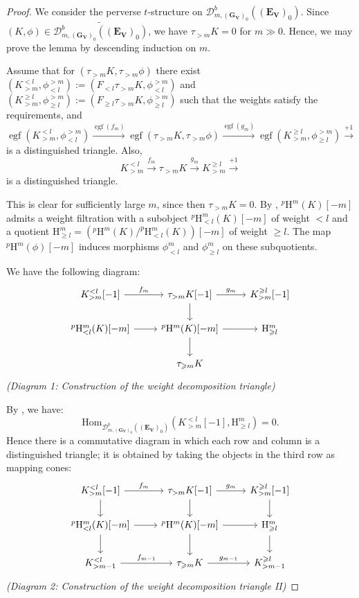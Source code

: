\documentclass[10pt,a4paper]{amsart}
\begin{document}
\begin{proof}
We consider the perverse $t$-structure on $\mathcal{D}^b_{m,(\mathbf{G}_{\mathbf{V}})_0}((\mathbf{E}_{\mathbf{V}})_0)$. Since $(K,\phi) \in \widetilde{\mathcal{D}^{b}_{m,(\mathbf{G}_{\mathbf{V}})_0}((\mathbf{E}_{\mathbf{V}})_0)}$, we have $\tau_{>m}K = 0$ for $m \gg 0$. Hence, we may prove the lemma by descending induction on $m$.

Assume that for $(\tau_{>m}K,\tau_{>m}\phi)$ there exist $(K_{>m}^{<l},\phi^{>m}_{<l}) := (F_{<l} \tau_{>m}K, \phi^{>m}_{<l})$ and $(K_{>m}^{\geq l},\phi^{>m}_{\geq l}) := (F_{\geq l} \tau_{>m}K, \phi^{>m}_{\geq l})$ such that the weights satisfy the requirements, and
\[
\operatorname{egf}(K_{>m}^{<l},\phi^{>m}_{<l}) \xrightarrow{\operatorname{egf}(f_m)} \operatorname{egf}(\tau_{>m}K,\tau_{>m}\phi) \xrightarrow{\operatorname{egf}(g_m)} \operatorname{egf}(K_{>m}^{\geq l},\phi^{>m}_{\geq l}) \xrightarrow{+1}
\]
is a distinguished triangle. Also,
\[
K_{>m}^{<l} \xrightarrow{f_m} \tau_{>m}K \xrightarrow{g_m} K_{>m}^{\geq l} \xrightarrow{+1}
\]
is a distinguished triangle.

This is clear for sufficiently large $m$, since then $\tau_{>m}K = 0$. By \cite[Theorem 5.4.16]{Pramod-2021}, $^{p}\mathrm{H}^m(K)[-m]$ admits a weight filtration with a subobject $^{p}\mathrm{H}^m_{<l}(K)[-m]$ of weight $< l$ and a quotient $\mathrm{H}^m_{\geq l} = (^{p}\mathrm{H}^m(K)/^{p}\mathrm{H}^m_{<l}(K))[-m]$ of weight $\geq l$. The map $^{p}\mathrm{H}^m(\phi)[-m]$ induces morphisms $\phi^m_{<l}$ and $\phi^m_{\geq l}$ on these subquotients.

We have the following diagram:
\[
\begin{tikzcd}
K_{>m}^{<l}[-1] \arrow[r, "f_m"] & \tau_{>m}K[-1] \arrow[r, "g_m"] \arrow[d] & K_{>m}^{\geq l}[-1] \\
^{p}\mathrm{H}^m_{<l}(K)[-m] \arrow[r] & ^{p}\mathrm{H}^m(K)[-m] \arrow[d] \arrow[r] & \mathrm{H}^m_{\geq l} \\
& \tau_{\geq m}K &
\end{tikzcd}
\]
\emph{(Diagram 1: Construction of the weight decomposition triangle)}

By \cite[Lemma 5.4.14(3)]{Pramod-2021}, we have:
\[
\mathrm{Hom}_{\mathcal{D}^b_{m,(\mathbf{G}_{\mathbf{V}})_0}((\mathbf{E}_{\mathbf{V}})_0)}(K_{>m}^{<l}[-1],\mathrm{H}^m_{\geq l})=0.
\]
Hence there is a commutative diagram in which each row and column is a distinguished triangle; it is obtained by taking the objects in the third row as mapping cones:
\[
\begin{tikzcd}
K_{>m}^{<l}[-1] \arrow[r, "f_m"] \arrow[d] & \tau_{>m}K[-1] \arrow[r, "g_m"] \arrow[d] & K_{>m}^{\geq l}[-1] \arrow[d] \\
^{p}\mathrm{H}^m_{<l}(K)[-m] \arrow[r] \arrow[d] & ^{p}\mathrm{H}^m(K)[-m] \arrow[d] \arrow[r] & \mathrm{H}^m_{\geq l} \arrow[d] \\
K_{>m-1}^{<l} \arrow[r, "f_{m-1}"] & \tau_{\geq m}K \arrow[r, "g_{m-1}"] & K_{>m-1}^{\geq l}
\end{tikzcd}
\]
\emph{(Diagram 2: Construction of the weight decomposition triangle II)}


\end{proof}
\end{document}
